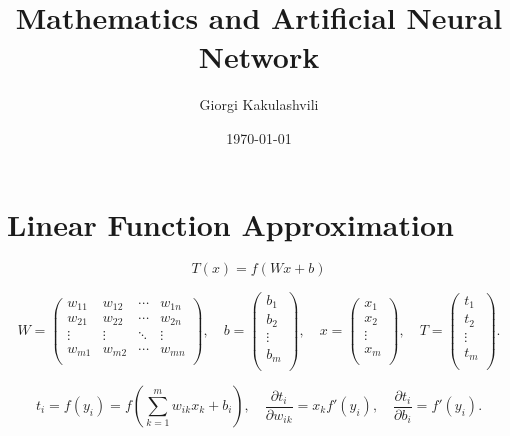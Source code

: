 \documentclass{article}
\numberwithin{equation}{section}
\theoremstyle{definition}
\theoremstyle{remark}
\begin{document}
\title{Mathematics and Artificial Neural Network}
\author{Giorgi Kakulashvili}
\date{\today}
\maketitle
\thispagestyle{fancy}



\section{Linear Function Approximation}


\begin{equation}\label{eq-basic-tr}
    T(x) = f\left( Wx + b \right)
\end{equation}

\[
    W = \begin{pmatrix}
        w_{11} & w_{12} & \cdots & w_{1n} \\
        w_{21} & w_{22} & \cdots & w_{2n} \\
        \vdots & \vdots & \ddots & \vdots \\
        w_{m1} & w_{m2} & \cdots & w_{mn} \\
    \end{pmatrix},
    \quad
    b = \begin{pmatrix}
        b_{1}  \\
        b_{2} \\
        \vdots \\
        b_{m} \\
    \end{pmatrix},
    \quad
    x = \begin{pmatrix}
        x_{1}  \\
        x_{2} \\
        \vdots \\
        x_{m} \\
    \end{pmatrix}, 
    \quad
    T = \begin{pmatrix}
        t_{1}  \\
        t_{2} \\
        \vdots \\
        t_{m} \\
    \end{pmatrix}.
\]

\[
    t_{i} = f(y_{i}) = f\left(\sum_{k=1}^{m} w_{ik} x_{k} + b_{i}\right), \quad
    \frac{\partial t_{i}}{\partial w_{ik}} = x_{k} f'(y_{i}), \quad
    \frac{\partial t_{i}}{\partial b_{i}} = f'(y_{i}).
\]
\end{document}

